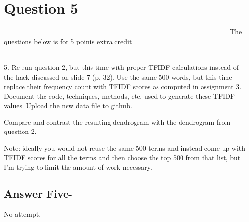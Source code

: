\documentclass[letterpaper,11pt]{article}
\begin{document}
\newpage
\section*{Question 5}
==========================================
The questions below is for 5 points extra credit
==========================================

5.  Re-run question 2, but this time with proper TFIDF calculations instead of the hack discussed on slide 7 (p. 32).  Use the same 500 words, but this time replace their frequency count with TFIDF scores as computed in assignment 3.  Document the code, techniques, methods, etc. used to generate these TFIDF values.  Upload the new data file to github.

Compare and contrast the resulting dendrogram with the dendrogram from question 2.

Note: ideally you would not reuse the same 500 terms and instead come up with TFIDF scores for all the terms and then choose the top 500 from that list, but I'm trying to limit the amount of work necessary.
\newpage
\subsection*{Answer Five-}
No attempt.
\end{document}
